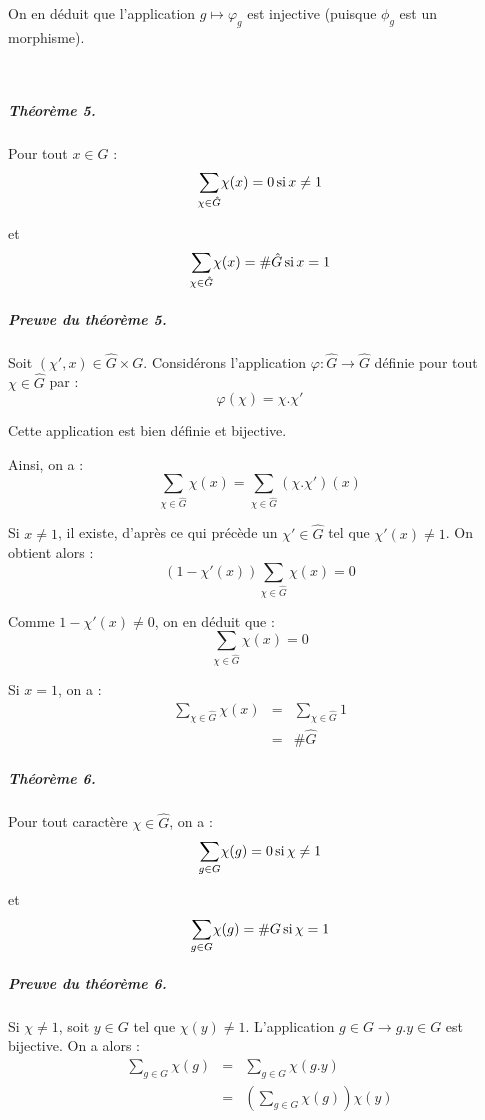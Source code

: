 On en d{\'e}duit que l'application $g \longmapsto \varphi_g$ est injective
(puisque $\phi_g$ est un morphisme).

\

\subparagraph{Th{\'e}or{\`e}me 5.}

Pour tout $x \in G$ :
\[ \underset{\chi \in \hat{G}}{\sum} \chi (x) = 0 \operatorname{si} x \neq 1 \]


et
\[ \underset{\chi \in \hat{G}}{\sum} \chi (x) =\# \hat{G} \operatorname{si} x = 1 \]


\subparagraph{Preuve du th{\'e}or{\`e}me 5.}

Soit $(\chi', x) \in \hat{G} \times G$. Consid{\'e}rons l'application $\varphi
: \hat{G} \longrightarrow \hat{G}$ d{\'e}finie pour tout $\chi \in \hat{G}$
par :
\[ \varphi (\chi) = \chi . \chi' \]


Cette application est bien d{\'e}finie et bijective.

Ainsi, on a :
\[ \underset{\chi \in \hat{G}}{\sum} \chi (x) = \underset{\chi \in
   \hat{G}}{\sum} (\chi . \chi') (x) \]


Si $x \neq 1$, il existe, d'apr{\`e}s ce qui pr{\'e}c{\`e}de un $\chi' \in
\hat{G}$ tel que $\chi' (x) \neq 1$. On obtient alors :
\[ (1 - \chi' (x)) \underset{\chi \in \hat{G}}{\sum} \chi (x) = 0 \]


Comme $1 - \chi' (x) \neq 0$, on en d{\'e}duit que :
\[ \underset{\chi \in \hat{G}}{\sum} \chi (x) = 0 \]


Si $x = 1$, on a :
\begin{eqnarray*}
  \underset{\chi \in \hat{G}}{\sum} \chi (x) & = & \underset{\chi \in
  \hat{G}}{\sum} 1\\
  & = & \# \hat{G}
\end{eqnarray*}


\subparagraph{Th{\'e}or{\`e}me 6.}

Pour tout caract{\`e}re $\chi \in \hat{G}$, on a :
\[ \underset{g \in G}{\sum} \chi (g) = 0 \operatorname{si} \chi \neq 1 \]


et
\[ \underset{g \in G}{\sum} \chi (g) =\#G \operatorname{si} \chi = 1 \]


\subparagraph{Preuve du th{\'e}or{\`e}me 6.}

Si $\chi \neq 1$, soit $y \in G$ tel que $\chi (y) \neq 1$. L'application $g
\in G \rightarrow g.y \in G$ est bijective. On a alors :
\begin{eqnarray*}
  \underset{g \in G}{\sum} \chi (g) & = & \underset{g \in G}{\sum} \chi
  (g.y)\\
  & = & \left( \underset{g \in G}{\sum} \chi (g) \right) \chi (y)
\end{eqnarray*}



